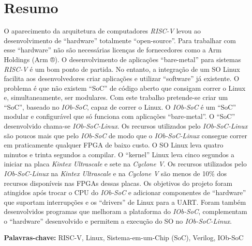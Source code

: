 \cleardoubleoddpage

\chapter*{Resumo}
\thispagestyle{empty} %

O aparecimento da arquitetura de computadores \textit{RISC-V} levou ao desenvolvimento de “hardware” totalmente “open-source”. Para trabalhar com esse “hardware” não são necessárias licenças de fornecedores como a Arm Holdings (Arm ®). O desenvolvimento de aplicações “bare-metal” para sistemas \textit{RISC-V} é um bom ponto de partida. No entanto, a integração de um SO Linux facilita aos desenvolvedores criar  aplicações e utilizar “software” já existente. O problema é que não existem “SoC” de código aberto que consigam correr o Linux e, simultaneamente, ser modulares.  
%  
Com este trabalho pretende-se criar um “SoC”, baseado no \textit{IOb-SoC}, capaz de correr o Linux. O \textit{IOb-SoC} é um “SoC” modular e configurável que só funciona com aplicações “bare-metal”. O “SoC” desenvolvido chama-se \textit{IOb-SoC-Linux}. Os recursos utilizados pelo \textit{IOb-SoC-Linux} são poucos mais que pelo \textit{IOb-SoC} de modo que o \textit{IOb-SoC-Linux} consegue correr em praticamente qualquer FPGA de baixo custo. O SO Linux leva quatro minutos e trinta segundos a compilar. O “kernel” Linux leva cinco segundos a iniciar na placa \textit{Kintex Ultrascale} e sete na \textit{Cyclone V}. Os recursos utilizados pelo \textit{IOb-SoC-Linux} na \textit{Kintex Ultrascale} e na \textit{Cyclone V} são menos de 10\% dos recursos disponíveis nas FPGAs dessas placas.
%
Os objetivos do projeto foram atingidos após trocar o CPU do \textit{IOb-SoC} e adicionar componentes de “hardware” que suportam interrupções e os “drivers” de Linux para a UART. Foram também desenvolvidos programas que melhoram a plataforma do \textit{IOb-SoC}, complementam o “hardware” desenvolvido e permitem a execução do SO no \textit{IOb-SoC-Linux}.

\vfill

\textbf{\Large Palavras-chave:} RISC-V, Linux, Sistema-em-um-Chip (SoC), Verilog, IOb-SoC

